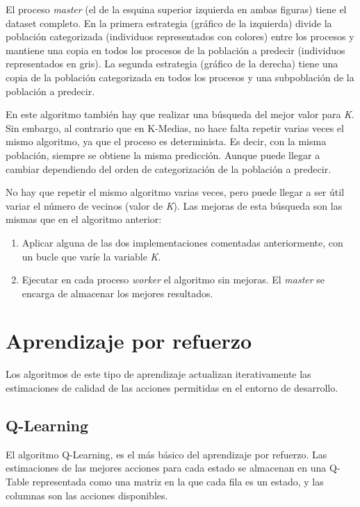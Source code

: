 		El proceso \textit{master} (el de la esquina superior izquierda en ambas figuras) tiene el dataset completo. En la primera estrategia (gráfico de la izquierda) divide la población categorizada (individuos representados con colores) entre los procesos y mantiene una copia en todos los procesos de la población a predecir (individuos representados en gris). La segunda estrategia (gráfico de la derecha) tiene una copia de la población categorizada en todos los procesos y una subpoblación de la población a predecir.
		
		
		En este algoritmo también hay que realizar una búsqueda del mejor valor para \textit{K}. Sin embargo, al contrario que en K-Medias, no hace falta repetir varias veces el mismo algoritmo, ya que el proceso es determinista. Es decir, con la misma población, siempre se obtiene la misma predicción. Aunque puede llegar a cambiar dependiendo del orden de categorización de la población a predecir. 
		
		No hay que repetir el mismo algoritmo varias veces, pero puede llegar a ser útil variar el número de vecinos (valor de \textit{K}). Las mejoras de esta búsqueda son las mismas que en el algoritmo anterior: 
		
		\begin{enumerate}
			\item Aplicar alguna de las dos implementaciones comentadas anteriormente, con un bucle que varíe la variable \textit{K}. 
			\item Ejecutar en cada proceso \textit{worker} el algoritmo sin mejoras. El \textit{master} se encarga de almacenar los mejores resultados.
		\end{enumerate}
		
		


\section{Aprendizaje por refuerzo}

	Los algoritmos de este tipo de aprendizaje actualizan iterativamente las estimaciones de calidad de las acciones permitidas en el entorno de desarrollo. 
	
	\subsection{Q-Learning}
		
		El algoritmo Q-Learning, es el más básico del aprendizaje por refuerzo. Las estimaciones de las mejores acciones para cada estado se almacenan en una Q-Table representada como una matriz en la que cada fila es un estado, y las columnas son las acciones disponibles. 
		
